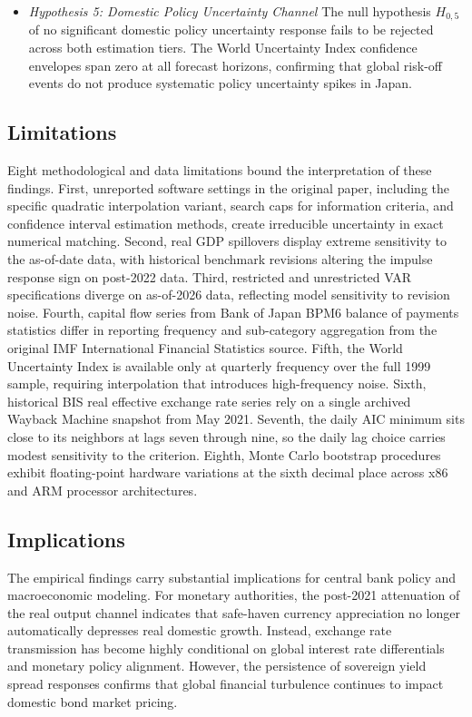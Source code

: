 \begin{itemize}
    \item \textit{Hypothesis 5: Domestic Policy Uncertainty Channel}
\newline The null hypothesis $H_{0,5}$ of no significant domestic policy uncertainty response fails to be rejected across both estimation tiers. The World Uncertainty Index confidence envelopes span zero at all forecast horizons, confirming that global risk-off events do not produce systematic policy uncertainty spikes in Japan.
\end{itemize}

\subsection{Limitations}

Eight methodological and data limitations bound the interpretation of these findings. First, unreported software settings in the original paper, including the specific quadratic interpolation variant, search caps for information criteria, and confidence interval estimation methods, create irreducible uncertainty in exact numerical matching. Second, real GDP spillovers display extreme sensitivity to the as-of-date data, with historical benchmark revisions altering the impulse response sign on post-2022 data. Third, restricted and unrestricted VAR specifications diverge on as-of-2026 data, reflecting model sensitivity to revision noise. Fourth, capital flow series from Bank of Japan BPM6 balance of payments statistics differ in reporting frequency and sub-category aggregation from the original IMF International Financial Statistics source. Fifth, the World Uncertainty Index is available only at quarterly frequency over the full 1999 sample, requiring interpolation that introduces high-frequency noise. Sixth, historical BIS real effective exchange rate series rely on a single archived Wayback Machine snapshot from May 2021. Seventh, the daily AIC minimum sits close to its neighbors at lags seven through nine, so the daily lag choice carries modest sensitivity to the criterion. Eighth, Monte Carlo bootstrap procedures exhibit floating-point hardware variations at the sixth decimal place across x86 and ARM processor architectures.

\subsection{Implications}

The empirical findings carry substantial implications for central bank policy and macroeconomic modeling. For monetary authorities, the post-2021 attenuation of the real output channel indicates that safe-haven currency appreciation no longer automatically depresses real domestic growth. Instead, exchange rate transmission has become highly conditional on global interest rate differentials and monetary policy alignment. However, the persistence of sovereign yield spread responses confirms that global financial turbulence continues to impact domestic bond market pricing.

